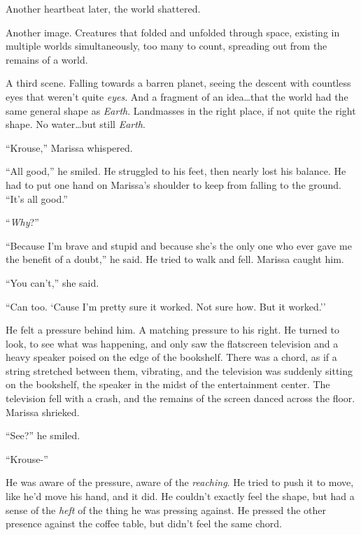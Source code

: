 Another heartbeat later, the world shattered.



Another image.  Creatures that folded and unfolded through space, existing in multiple worlds simultaneously, too many to count, spreading out from the remains of a world.



A third scene.  Falling towards a barren planet, seeing the descent with countless eyes that weren't quite \emph{eyes}.  And a fragment of an idea\ldots that the world had the same general shape as \emph{Earth}.  Landmasses in the right place, if not quite the right shape.  No water\ldots but still \emph{Earth}.



``Krouse,'' Marissa whispered.



``All good,'' he smiled.  He struggled to his feet, then nearly lost his balance.  He had to put one hand on Marissa's shoulder to keep from falling to the ground.  ``It's all good.''



``\emph{Why}?''



``Because I'm brave and stupid and because she's the only one who ever gave me the benefit of a doubt,'' he said.  He tried to walk and fell.  Marissa caught him.



``You can't,'' she said.



``Can too.  `Cause I'm pretty sure it worked.  Not sure how.  But it worked.''



He felt a pressure behind him.  A matching pressure to his right.  He turned to look, to see what was happening, and only saw the flatscreen television and a heavy speaker poised on the edge of the bookshelf.  There was a chord, as if a string stretched between them, vibrating, and the television was suddenly sitting on the bookshelf, the speaker in the midst of the entertainment center.  The television fell with a crash, and the remains of the screen danced across the floor.  Marissa shrieked.



``See?'' he smiled.



``Krouse-''



He was aware of the pressure, aware of the \emph{reaching}.  He tried to push it to move, like he'd move his hand, and it did.  He couldn't exactly feel the shape, but had a sense of the \emph{heft} of the thing he was pressing against.  He pressed the other presence against the coffee table, but didn't feel the same chord.



